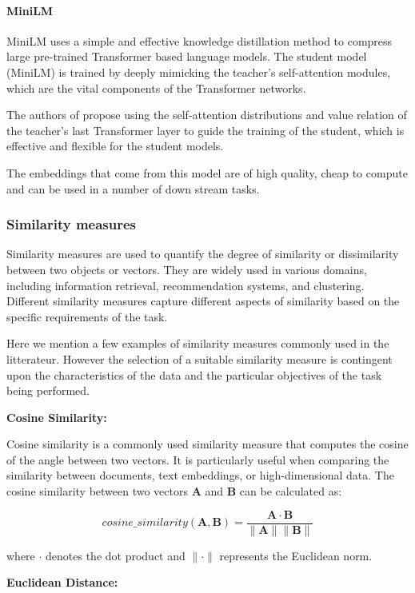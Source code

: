 \documentclass[a4paper,12pt]{article}
\begin{document}
\paragraph{MiniLM}
MiniLM \cite{minilm} uses a simple and effective knowledge distillation method to compress large pre-trained Transformer based language models. The student model (MiniLM) is trained by deeply mimicking the teacher’s self-attention \cite{attention} modules,
which are the vital components of the Transformer networks.

The authors of \cite{minilm} propose using the self-attention distributions and value
relation of the teacher’s last Transformer layer to guide the
training of the student, which is effective and flexible for the student models. 

The embeddings that come from this model are of high quality, cheap to compute and can be used in a number of down stream tasks.


\subsubsection{Similarity measures}
Similarity measures are used to quantify the degree of similarity or dissimilarity between two objects or vectors. They are widely used in various domains, including information retrieval, recommendation systems, and clustering. Different similarity measures capture different aspects of similarity based on the specific requirements of the task.

Here we mention a few examples of similarity measures commonly used in the litterateur. However the selection of a suitable similarity measure is contingent upon the characteristics of the data and the particular objectives of the task being performed.


\textbf{Cosine Similarity:}

Cosine similarity is a commonly used similarity measure that computes the cosine of the angle between two vectors. It is particularly useful when comparing the similarity between documents, text embeddings, or high-dimensional data. The cosine similarity between two vectors $\mathbf{A}$ and $\mathbf{B}$ can be calculated as:

$$cosine\_similarity(\mathbf{A}, \mathbf{B}) = \frac{\mathbf{A} \cdot \mathbf{B}}{\|\mathbf{A}\| \|\mathbf{B}\|}$$

where $\cdot$ denotes the dot product and $\|\cdot\|$ represents the Euclidean norm.

\textbf{Euclidean Distance:}
\end{document}

